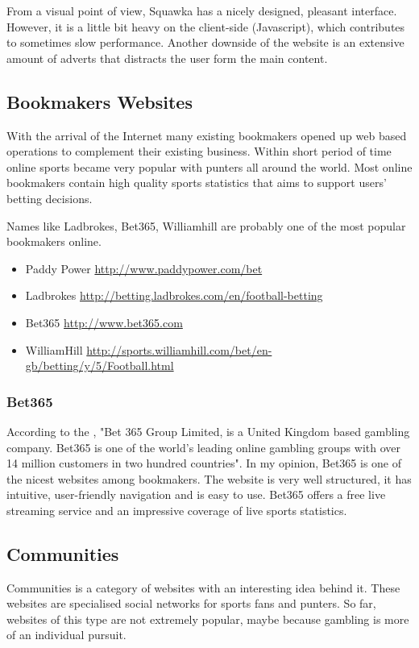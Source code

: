 From a visual point of view, Squawka has a nicely designed, pleasant interface. However, it is a little bit heavy on the client-side (Javascript), which contributes to sometimes slow performance. Another downside of the website is an extensive amount of adverts that distracts the user form the main content.
	
\subsection{Bookmakers Websites}
\label{subsec:bookmakerswebsites_req}
	
With the arrival of the Internet many existing bookmakers opened up web based operations to complement their existing business. Within short period of time online sports became very popular with punters all around the world. Most online bookmakers contain high quality sports statistics that aims to support users' betting decisions.

Names like Ladbrokes, Bet365, Williamhill are probably one of the most popular bookmakers online.

\begin{itemize}
	\item Paddy Power \url{http://www.paddypower.com/bet}
	\item Ladbrokes \url{http://betting.ladbrokes.com/en/football-betting}
	\item Bet365 \url{http://www.bet365.com}
	\item WilliamHill \url{http://sports.williamhill.com/bet/en-gb/betting/y/5/Football.html}
\end{itemize}

\subsubsection{Bet365}
\label{susubsec:bet365}

According to the \citet{wiki:bet365}, "Bet 365 Group Limited, is a United Kingdom based gambling company. Bet365 is one of the world’s leading online gambling groups with over 14 million customers in two hundred countries". In my opinion, Bet365 is one of the nicest websites among bookmakers. The website is very well structured, it has intuitive, user-friendly navigation and is easy to use. Bet365 offers a free live streaming service and an impressive coverage of live sports statistics.

\subsection{Communities}
\label{subsec:communities_req}
Communities is a category of websites with an interesting idea behind it. These websites are specialised social networks for sports fans and punters. So far, websites of this type are not extremely popular, maybe because gambling is more of an individual pursuit.

